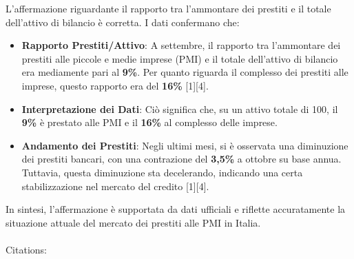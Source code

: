 \documentclass[
  letterpaper,
  DIV=11,
  numbers=noendperiod]{scrartcl}
\makeatletter
\let\oldparagraph\paragraph
\renewcommand{\paragraph}{
    \@ifstar
      \xxxParagraphStar
      \xxxParagraphNoStar
  }
\newcommand{\xxxParagraphStar}[1]{\oldparagraph*{#1}\mbox{}}
\newcommand{\xxxParagraphNoStar}[1]{\oldparagraph{#1}\mbox{}}
\makeatother
\begin{document}
L'affermazione riguardante il rapporto tra l'ammontare dei prestiti e il
totale dell'attivo di bilancio è corretta. I dati confermano che:

\begin{itemize}
\item
  \textbf{Rapporto Prestiti/Attivo}: A settembre, il rapporto tra
  l'ammontare dei prestiti alle piccole e medie imprese (PMI) e il
  totale dell'attivo di bilancio era mediamente pari al \textbf{9\%}.
  Per quanto riguarda il complesso dei prestiti alle imprese, questo
  rapporto era del \textbf{16\%} {[}1{]}{[}4{]}.
\item
  \textbf{Interpretazione dei Dati}: Ciò significa che, su un attivo
  totale di 100, il \textbf{9\%} è prestato alle PMI e il \textbf{16\%}
  al complesso delle imprese.
\item
  \textbf{Andamento dei Prestiti}: Negli ultimi mesi, si è osservata una
  diminuzione dei prestiti bancari, con una contrazione del
  \textbf{3,5\%} a ottobre su base annua. Tuttavia, questa diminuzione
  sta decelerando, indicando una certa stabilizzazione nel mercato del
  credito {[}1{]}{[}4{]}.
\end{itemize}

\begin{tcolorbox}[enhanced jigsaw, bottomrule=.15mm, opacityback=0, leftrule=.75mm, breakable, titlerule=0mm, left=2mm, title=\textcolor{quarto-callout-warning-color}{\faExclamationTriangle}\hspace{0.5em}{Conclusione}, colframe=quarto-callout-warning-color-frame, coltitle=black, colback=white, toprule=.15mm, colbacktitle=quarto-callout-warning-color!10!white, bottomtitle=1mm, toptitle=1mm, arc=.35mm, rightrule=.15mm, opacitybacktitle=0.6]

In sintesi, l'affermazione è supportata da dati ufficiali e riflette
accuratamente la situazione attuale del mercato dei prestiti alle PMI in
Italia.

\end{tcolorbox}

\paragraph{Citations:}\label{citations-1}
\end{document}
